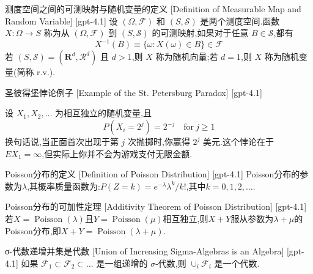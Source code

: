 \documentclass[UTF8]{ctexart}
\begin{document}
    
    
    \begin{dfn}
        {测度空间之间的可测映射与随机变量的定义}
        [Definition of Measurable Map and Random Variable]
        [gpt-4.1]
        设 $(\Omega, \mathcal{F})$ 和 $(S, \mathcal{S})$ 是两个测度空间.函数 $X : \Omega \to S$ 称为从 $(\Omega, \mathcal{F})$ 到 $(S, \mathcal{S})$ 的可测映射,如果对于任意 $B \in \mathcal{S}$,都有
\[
X^{-1}(B) \equiv \{ \omega : X(\omega) \in B \} \in \mathcal{F}
\]
若 $(S, \mathcal{S}) = (\mathbf{R}^{d}, \mathcal{R}^{d})$ 且 $d > 1$,则 $X$ 称为随机向量;若 $d = 1$,则 $X$ 称为随机变量(简称 r.v.).

    \end{dfn}
    
    
    
    \begin{xmp}
        {圣彼得堡悖论例子}
        [Example of the St. Petersburg Paradox]
        [gpt-4.1]
        
设 $X_{1}, X_{2}, \dots$ 为相互独立的随机变量,且
\[
P(X_{i} = 2^{j}) = 2^{-j} \quad \mathrm{for~} j \geq 1
\]
换句话说,当正面首次出现于第 $j$ 次抛掷时,你赢得 $2^{j}$ 美元.这个悖论在于 $E X_{1} = \infty$,但实际上你并不会为游戏支付无限金额.

    \end{xmp}
    
    
    
    \begin{dfn}
        {Poisson分布的定义}
        [Definition of Poisson Distribution]
        [gpt-4.1]
        Poisson分布的参数为$\lambda$,其概率质量函数为:$P(Z=k) = e^{-\lambda} \lambda^k / k!$,其中$k=0,1,2,\ldots$.
    \end{dfn}
    
    
    
    \begin{thm}
        {Poisson分布的可加性定理}
        [Additivity Theorem of Poisson Distribution]
        [gpt-4.1]
        若$X = \operatorname{Poisson}(\lambda)$且$Y = \operatorname{Poisson}(\mu)$相互独立,则$X+Y$服从参数为$\lambda+\mu$的Poisson分布,即$X+Y = \operatorname{Poisson}(\lambda + \mu)$.
    \end{thm}
    
    
    
    \begin{thm}
        {σ-代数递增并集是代数}
        [Union of Increasing Sigma-Algebras is an Algebra]
        [gpt-4.1]
        如果 ${\mathcal{F}}_{1} \subset {\mathcal{F}}_{2} \subset \ldots$ 是一组递增的 $\sigma$-代数,则 $\cup_{i} {\mathcal{F}}_{i}$ 是一个代数.
    \end{thm}
    
\end{document}
